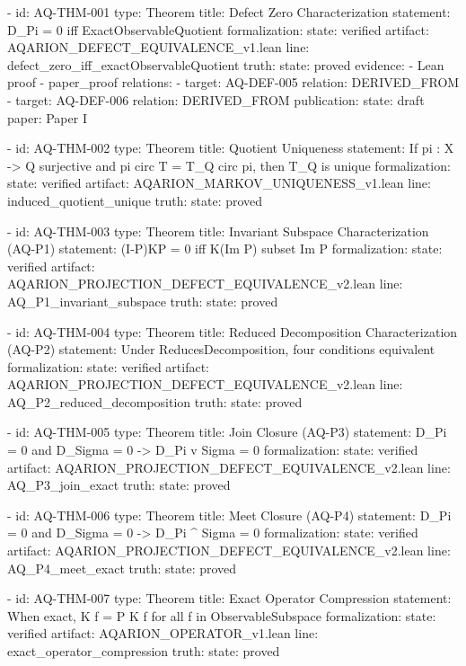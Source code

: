{{{{{{{{{{{{{  - id: AQ-THM-001
    type: Theorem
    title: Defect Zero Characterization
    statement: D_Pi = 0 iff ExactObservableQuotient
    formalization:
      state: verified
      artifact: AQARION_DEFECT_EQUIVALENCE_v1.lean
      line: defect_zero_iff_exactObservableQuotient
    truth:
      state: proved
    evidence:
      - Lean proof
      - paper_proof
    relations:
      - target: AQ-DEF-005
        relation: DERIVED_FROM
      - target: AQ-DEF-006
        relation: DERIVED_FROM
    publication:
      state: draft
      paper: Paper I

  - id: AQ-THM-002
    type: Theorem
    title: Quotient Uniqueness
    statement: If pi : X -> Q surjective and pi circ T = T_Q circ pi, then T_Q is unique
    formalization:
      state: verified
      artifact: AQARION_MARKOV_UNIQUENESS_v1.lean
      line: induced_quotient_unique
    truth:
      state: proved

  - id: AQ-THM-003
    type: Theorem
    title: Invariant Subspace Characterization (AQ-P1)
    statement: (I-P)KP = 0 iff K(Im P) subset Im P
    formalization:
      state: verified
      artifact: AQARION_PROJECTION_DEFECT_EQUIVALENCE_v2.lean
      line: AQ_P1_invariant_subspace
    truth:
      state: proved

  - id: AQ-THM-004
    type: Theorem
    title: Reduced Decomposition Characterization (AQ-P2)
    statement: Under ReducesDecomposition, four conditions equivalent
    formalization:
      state: verified
      artifact: AQARION_PROJECTION_DEFECT_EQUIVALENCE_v2.lean
      line: AQ_P2_reduced_decomposition
    truth:
      state: proved

  - id: AQ-THM-005
    type: Theorem
    title: Join Closure (AQ-P3)
    statement: D_Pi = 0 and D_Sigma = 0 -> D_{Pi v Sigma} = 0
    formalization:
      state: verified
      artifact: AQARION_PROJECTION_DEFECT_EQUIVALENCE_v2.lean
      line: AQ_P3_join_exact
    truth:
      state: proved

  - id: AQ-THM-006
    type: Theorem
    title: Meet Closure (AQ-P4)
    statement: D_Pi = 0 and D_Sigma = 0 -> D_{Pi ^ Sigma} = 0
    formalization:
      state: verified
      artifact: AQARION_PROJECTION_DEFECT_EQUIVALENCE_v2.lean
      line: AQ_P4_meet_exact
    truth:
      state: proved

  - id: AQ-THM-007
    type: Theorem
    title: Exact Operator Compression
    statement: When exact, K f = P K f for all f in ObservableSubspace
    formalization:
      state: verified
      artifact: AQARION_OPERATOR_v1.lean
      line: exact_operator_compression
    truth:
      state: proved

}}}}}}}}}}}}}
